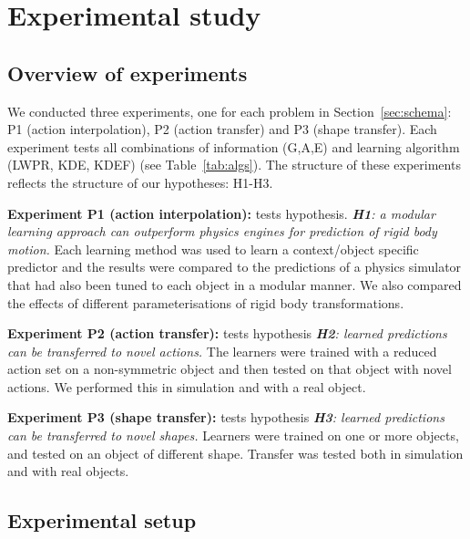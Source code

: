 
\newlength{\barchartwidth}
\setlength{\barchartwidth}{6.5cm}

\section{Experimental study}\label{sec:Experiment}

\subsection{Overview of experiments}\label{sec:Experiment.Overview}

We conducted three experiments, one for each problem in Section~\ref{sec:schema}: P1 (action interpolation), P2 (action transfer) and P3
(shape transfer). Each experiment tests all combinations of information (G,A,E) and learning algorithm (LWPR, KDE, KDEF) (see Table~\ref{tab:algs}). The structure of these experiments reflects the structure of our hypotheses: H1-H3.

{\bf Experiment P1 (action interpolation):} tests hypothesis. {\em {\bf H1}: a modular learning approach can outperform physics engines for prediction of rigid body motion.} Each learning method was used to learn a context/object specific predictor and the results were compared to the predictions of a physics simulator that had also been tuned to each object in a modular manner. We also compared the effects of different parameterisations of rigid body transformations.

{\bf Experiment P2 (action transfer):} tests hypothesis {\em {\bf H2}: learned predictions can be transferred to novel actions.} The learners were trained with a reduced action set on a non-symmetric object and then tested on that object with novel actions. We performed this in simulation and with a real object.

{\bf Experiment P3 (shape transfer):} tests hypothesis {\em {\bf H3}: learned predictions can be transferred to novel shapes.} Learners were trained on one or more objects, and tested on an object of different shape. Transfer was tested both in simulation and with real objects.

\subsection{Experimental setup}\label{sec:Experiment.Setup}

